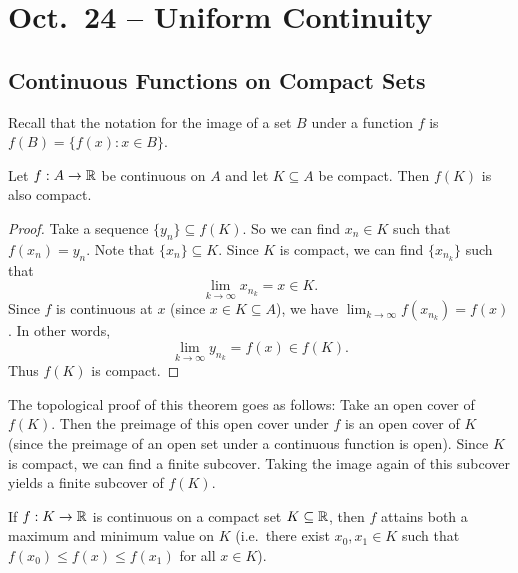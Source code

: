 \chapter{Oct.~24 -- Uniform Continuity}

\section{Continuous Functions on Compact Sets}
Recall that the notation for the image of a set $B$ under
a function $f$ is $f(B) = \{f(x) : x \in B\}$.

\begin{theorem}
  Let $f : A \to \mathbb{R}$ be continuous on $A$ and let
  $K \subseteq A$ be compact. Then $f(K)$ is also
  compact.
\end{theorem}

\begin{proof}
  Take a sequence $\{y_n\} \subseteq f(K)$. So we
  can find $x_n \in K$ such that $f(x_n) = y_n$.
  Note that $\{x_n\} \subseteq K$. Since $K$ is
  compact, we can find $\{x_{n_k}\}$ such that
  \[\lim_{k \to \infty} x_{n_k} = x \in K.\]
  Since $f$ is continuous at $x$ (since
  $x \in K \subseteq A$), we have
  $\lim_{k \to \infty} f(x_{n_k}) = f(x)$. In other words,
  \[\lim_{k \to \infty} y_{n_k} = f(x) \in f(K).\]
  Thus $f(K)$ is compact.
\end{proof}

\begin{remark}
  The topological proof of this theorem goes as follows:
  Take an open
  cover of $f(K)$. Then the preimage of this open cover
  under $f$ is an open cover of $K$ (since the preimage
  of an open set under a continuous function is open).
  Since $K$ is compact,
  we can find a finite subcover. Taking the image again
  of this subcover yields a finite subcover of $f(K)$.
\end{remark}

\begin{theorem}
  If $f : K \to \mathbb{R}$ is continuous on a compact set
  $K \subseteq \mathbb{R}$, then $f$ attains both a maximum and
  minimum value on $K$ (i.e.~there exist $x_0, x_1 \in K$
  such that $f(x_0) \le f(x) \le f(x_1)$ for all
  $x \in K$).
\end{theorem}

